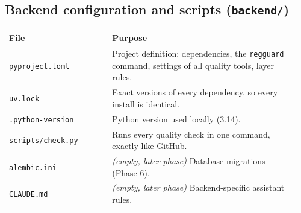 \documentclass[11pt,a4paper]{article}
\newcommand{\code}[1]{\nolinkurl{#1}}
\newcommand{\empt}{\textit{(empty, later phase)}}
\begin{document}
\subsection{Backend configuration and scripts (\texorpdfstring{\texttt{backend/}}{backend/})}
\begin{longtable}{@{}p{0.34\linewidth}p{0.62\linewidth}@{}}
\toprule
\textbf{File} & \textbf{Purpose} \\
\midrule
\endhead
\code{pyproject.toml} & Project definition: dependencies, the \code{regguard} command, settings of all quality tools, layer rules. \\
\code{uv.lock} & Exact versions of every dependency, so every install is identical. \\
\code{.python-version} & Python version used locally (3.14). \\
\code{scripts/check.py} & Runs every quality check in one command, exactly like GitHub. \\
\code{alembic.ini} & \empt{} Database migrations (Phase 6). \\
\code{CLAUDE.md} & \empt{} Backend-specific assistant rules. \\
\bottomrule
\end{longtable}
\end{document}
